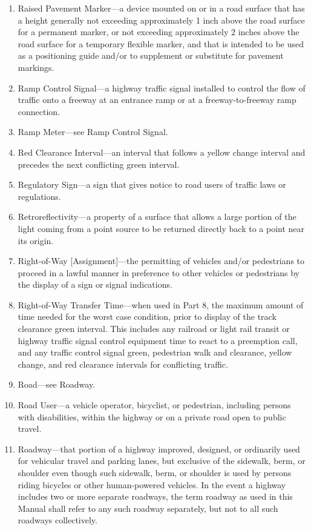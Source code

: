 \documentclass[9pt]{memoir}
\begin{document}
{\begin{enumerate}[label=\arabic*., ref=\arabic*]
\item Raised Pavement Marker---a device mounted on or in a road surface that has a height generally not exceeding approximately 1 inch above the road surface for a permanent marker, or not exceeding approximately 2 inches above the road surface for a temporary flexible marker, and that is intended to be used as a positioning guide and/or to supplement or substitute for pavement markings.
\item Ramp Control Signal---a highway traffic signal installed to control the flow of traffic onto a freeway at an entrance ramp or at a freeway-to-freeway ramp connection.
\item Ramp Meter---see Ramp Control Signal.
\item Red Clearance Interval---an interval that follows a yellow change interval and precedes the next conflicting green interval.
\item Regulatory Sign---a sign that gives notice to road users of traffic laws or regulations.
\item Retroreflectivity---a property of a surface that allows a large portion of the light coming from a point source to be returned directly back to a point near its origin.
\item Right-of-Way [Assignment]---the permitting of vehicles and/or pedestrians to proceed in a lawful manner in preference to other vehicles or pedestrians by the display of a sign or signal indications.
\item Right-of-Way Transfer Time---when used in Part 8, the maximum amount of time needed for the worst case condition, prior to display of the track clearance green interval. This includes any railroad or light rail transit or highway traffic signal control equipment time to react to a preemption call, and any traffic control signal green, pedestrian walk and clearance, yellow change, and red clearance intervals for conflicting traffic.
\item Road---see Roadway.
\item Road User---a vehicle operator, bicyclist, or pedestrian, including persons with disabilities, within the highway or on a private road open to public travel.
\item Roadway---that portion of a highway improved, designed, or ordinarily used for vehicular travel and parking lanes, but exclusive of the sidewalk, berm, or shoulder even though such sidewalk, berm, or shoulder is used by persons riding bicycles or other human-powered vehicles. In the event a highway includes two or more separate roadways, the term roadway as used in this Manual shall refer to any such roadway separately, but not to all such roadways collectively.

\end{enumerate}}
\end{document}
